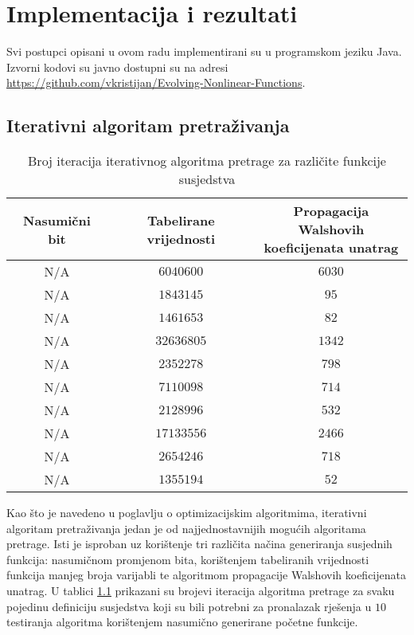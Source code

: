\chapter{Implementacija i rezultati}

Svi postupci opisani u ovom radu implementirani su u programskom jeziku Java.
Izvorni kodovi su javno dostupni su na adresi \href{https://github.com/vkristijan/Evolving-Nonlinear-Functions}{https://github.com/vkristijan/Evolving-Nonlinear-Functions}.

\section{Iterativni algoritam pretraživanja}
\begin{table}[]
    \centering
    \begin{tabular}{ccc}
        Nasumični bit & Tabelirane vrijednosti & \makecell{Propagacija Walshovih \\ koeficijenata unatrag} \\ \hline
        N/A &  $6 040 600$ & $6 030$ \\
        N/A &  $1 843 145$ &    $95$ \\
        N/A &  $1 461 653$ &    $82$ \\
        N/A & $32 636 805$ & $1 342$ \\
        N/A &  $2 352 278$ &   $798$ \\
        N/A &  $7 110 098$ &   $714$ \\
        N/A &  $2 128 996$ &   $532$ \\
        N/A & $17 133 556$ & $2 466$ \\
        N/A &  $2 654 246$ &   $718$ \\
        N/A &  $1 355 194$ &    $52$
    \end{tabular}
    \captionsetup{justification=centering}
    \caption{Broj iteracija iterativnog algoritma pretrage za različite funkcije susjedstva}
    \label{tbl:iterative_6}
\end{table}

Kao što je navedeno u poglavlju o optimizacijskim algoritmima, iterativni algoritam pretraživanja jedan je od najjednostavnijih mogućih algoritama pretrage. 
Isti je isproban uz korištenje tri različita načina generiranja susjednih funkcija: nasumičnom promjenom bita, korištenjem tabeliranih vrijednosti funkcija manjeg broja varijabli te algoritmom propagacije Walshovih koeficijenata unatrag.
U tablici \ref{tbl:iterative_6} prikazani su brojevi iteracija algoritma pretrage za svaku pojedinu definiciju susjedstva koji su bili potrebni za pronalazak rješenja u $10$ testiranja algoritma korištenjem nasumično generirane početne funkcije.

